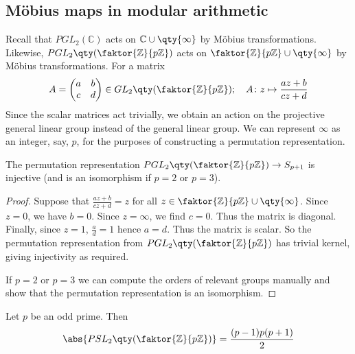 \subsection{M\"obius maps in modular arithmetic}
Recall that $PGL_2(\mathbb C)$ acts on $\mathbb C \cup \qty{\infty}$ by M\"obius transformations.
Likewise, $PGL_2\qty(\faktor{\mathbb Z}{p\mathbb Z})$ acts on $\faktor{\mathbb Z}{p\mathbb Z} \cup \qty{\infty}$ by M\"obius transformations.
For a matrix
\begin{align*}
	A = \begin{pmatrix}
		a & b \\
		c & d
	\end{pmatrix} \in GL_2\qty(\faktor{\mathbb Z}{p\mathbb Z});\quad A \colon z \mapsto \frac{az+b}{cz+d}
\end{align*}
Since the scalar matrices act trivially, we obtain an action on the projective general linear group instead of the general linear group.
We can represent $\infty$ as an integer, say, $p$, for the purposes of constructing a permutation representation.
\begin{lemma}
	The permutation representation $PGL_2\qty(\faktor{\mathbb Z}{p\mathbb Z}) \to S_{p+1}$ is injective (and is an isomorphism if $p = 2$ or $p = 3$).
\end{lemma}
\begin{proof}
	Suppose that $\frac{az+b}{cz+d} = z$ for all $z \in \faktor{\mathbb Z}{p\mathbb Z} \cup \qty{\infty}$.
	Since $z = 0$, we have $b = 0$.
	Since $z = \infty$, we find $c = 0$.
	Thus the matrix is diagonal.
	Finally, since $z = 1$, $\frac{a}{d} = 1$ hence $a = d$.
	Thus the matrix is scalar.
	So the permutation representation from $PGL_2\qty(\faktor{\mathbb Z}{p \mathbb Z})$ has trivial kernel, giving injectivity as required.

	If $p = 2$ or $p = 3$ we can compute the orders of relevant groups manually and show that the permutation representation is an isomorphism.
\end{proof}
\begin{lemma}
	Let $p$ be an odd prime.
	Then
	\begin{align*}
		\abs{PSL_2\qty(\faktor{\mathbb Z}{p\mathbb Z})} = \frac{(p-1)p(p+1)}{2}
	\end{align*}
\end{lemma}
